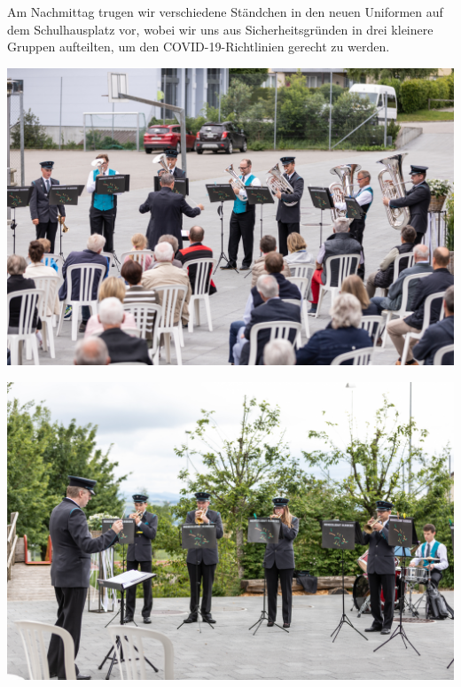 \begin{history}
    Am Nachmittag trugen wir verschiedene Ständchen in den neuen Uniformen auf
    dem Schulhausplatz vor, wobei wir uns aus Sicherheitsgründen in drei
    kleinere Gruppen aufteilten, um den COVID-19-Richtlinien gerecht zu werden.

    \begin{MulticolFigure}
        \centering
        \includegraphics[width=0.93\linewidth]{./chap/2001-2024/2021/Ensemble-1.jpg}
    \end{MulticolFigure}

    \begin{MulticolFigure}
        \centering
        \includegraphics[width=0.93\linewidth]{./chap/2001-2024/2021/Ensemble-2.jpg}
    \end{MulticolFigure}


\end{history}
